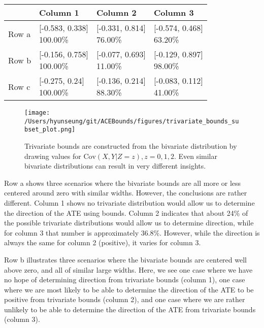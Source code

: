 \documentclass[
]{article}
\theoremstyle{plain}
\begin{document}
{\begin{table}[H]
\begin{tabular}{llll}
\toprule
  & Column 1 & Column 2 & Column 3\\
\midrule
Row a & \makecell[l]{[-0.583, 0.338]\\100.00\%} & \makecell[c]{[-0.331, 0.814]\\76.00\%} & \makecell[r]{[-0.574, 0.468]\\63.20\%}\\
Row b & \makecell[l]{[-0.156, 0.758]\\100.00\%} & \makecell[c]{[-0.077, 0.693]\\11.00\%} & \makecell[r]{[-0.129, 0.897]\\98.00\%}\\
Row c & \makecell[l]{[-0.275, 0.24]\\100.00\%} & \makecell[c]{[-0.136, 0.214]\\88.30\%} & \makecell[r]{[-0.083, 0.112]\\41.00\%}\\
\bottomrule
\end{tabular}


\end{table}

\begin{figure}[H]
  \center
  \texttt{[image: /Users/hyunseung/git/ACEBounds/figures/trivariate\_bounds\_subset\_plot.png]}
  \caption{Trivariate bounds are constructed from the bivariate distribution by drawing values for $\text{Cov}(X,Y|Z=z),z=0,1,2$. Even similar bivariate distributions can result in very different insights.}
  \label{fig:trivariate_bounds}
\end{figure}

Row a shows three scenarios where the bivariate bounds are all more or less centered around zero with similar widths. However, the conclusions are rather different. Column 1 shows no trivariate distribution would allow us to determine the direction of the ATE using bounds. Column 2 indicates that about 24\% of the possible trivariate distributions would allow us to determine direction, while for column 3 that number is approximately 36.8\%. However, while the direction is always the same for column 2 (positive), it varies for column 3.

Row b illustrates three scenarios where the bivariate bounds are centered well above zero, and all of similar large widths. Here, we see one case where we have no hope of determining direction from trivariate bounds (column 1), one case where we are most likely to be able to determine the direction of the ATE to be positive from trivariate bounds (column 2), and one case where we are rather unlikely to be able to determine the direction of the ATE from trivariate bounds (column 3).

}
\end{document}
